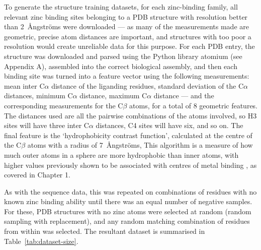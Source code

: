 To generate the structure training datasets, for each zinc-binding family, all relevant zinc binding sites belonging to a PDB structure with resolution better than 2~{\AA}ngstr\"{o}ms were downloaded --- as many of the measurements made are geometric, precise atom distances are important, and structures with too poor a resolution would create unreliable data for this purpose. For each PDB entry, the structure was downloaded and parsed using the Python library atomium (see Appendix A), assembled into the correct biological assembly, and then each binding site was turned into a feature vector using the following measurements: mean inter C$\alpha$ distance of the liganding residues, standard deviation of the C$\alpha$ distances, minimum C$\alpha$ distance, maximum C$\alpha$ distance --- and the corresponding measurements for the C$\beta$ atoms, for a total of 8 geometric features. The distances used are all the pairwise combinations of the atoms involved, so H3 sites will have three inter C$\alpha$ distances, C4 sites will have six, and so on. The final feature is the `hydrophobicity contrast function', calculated at the centre of the C$\beta$ atoms with a radius of 7~{\AA}ngstr\"{o}ms, This algorithm is a measure of how much outer atoms in a sphere are more hydrophobic than inner atoms, with higher values previously shown to be associated
with centres of metal binding \cite{yamashita1990metal,gregory1993prediction}, as covered in Chapter 1.

As with the sequence data, this was repeated on combinations of residues with no known zinc binding ability until there was an equal number of negative samples. For these, PDB structures with no zinc atoms were selected at random (random sampling with replacement), and any random matching combination of residues from within was selected. The resultant dataset is summarised in Table~\ref{tab:dataset-size}.

